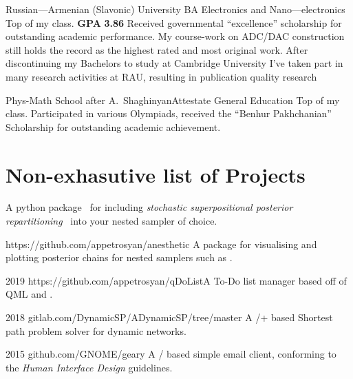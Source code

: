 \documentclass{CurriculumVitae}[10pt, draft, condensed]
\begin{document}
{    {Russian---Armenian (Slavonic) University}
   {BA }{Electronics and Nano---electronics} {Top of my
     class. \textbf{GPA} \textbf{3.86} Received governmental
     ``excellence'' scholarship for outstanding academic
     performance. My course-work on ADC/DAC construction still holds
     the record as the highest rated and most original work. After
     discontinuing my Bachelors to study at Cambridge University I've
     taken part in many research activities at RAU, resulting in
     publication quality research~\cite{cu2o,measurement}}
   
    {Phys-Math School after
     A.~Shaghinyan}{Attestate }{General Education} {Top of my
     class. Participated in various Olympiads, received the ``Benhur
     Pakhchanian'' Scholarship for outstanding academic achievement. }

\section*{Non-exhasutive list of Projects}%
%


 {A
  python package~\cite{sspr-joss} for including \emph{stochastic
    superpositional posterior repartitioning}~\cite{sspr} into your
  nested sampler of choice.}

 {https://github.com/appetrosyan/anesthetic}
{A package for visualising and plotting posterior chains for nested
  samplers such as .}

 {2019} {https://github.com/appetrosyan/qDoList}{A
  To-Do list manager based off of QML and .}

 {2018}
{gitlab.com/DynamicSP/ADynamicSP/tree/master} {A
  /+ based Shortest path problem solver for
  dynamic networks. }

 {2015} {github.com/GNOME/geary} {A
  / based simple email client, conforming to the
   \emph{Human Interface Design} guidelines.}

}
\end{document}
